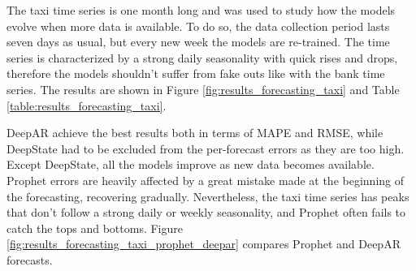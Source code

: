 \documentclass[a4paper, 12pt]{article} %
\begin{document}
	The taxi time series is one month long and was used to study how the models evolve when more data is available. To do so, the data collection period lasts seven days as usual, but every new week the models are re-trained. The time series is characterized by a strong daily seasonality with quick rises and drops, therefore the models shouldn't suffer from fake outs like with the bank time series. The results are shown in Figure \ref{fig:results_forecasting_taxi} and Table \ref{table:results_forecasting_taxi}. 
	
	DeepAR achieve the best results both in terms of MAPE and RMSE, while DeepState had to be excluded from the per-forecast errors as they are too high. Except DeepState, all the models improve as new data becomes available. Prophet errors are heavily affected by a great mistake made at the beginning of the forecasting, recovering gradually. Nevertheless, the taxi time series has peaks that don't follow a strong daily or weekly seasonality, and Prophet often fails to catch the tops and bottoms. Figure \ref{fig:results_forecasting_taxi_prophet_deepar} compares Prophet and DeepAR forecasts.
	
\end{document}
